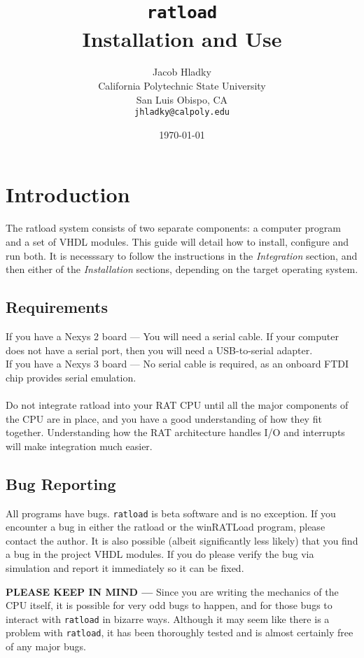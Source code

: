 \documentclass[notitlepage]{article}
\makeatletter
\newcommand*{\toccontents}{\@starttoc{toc}}
\makeatother
\begin{document}
\title{\huge{\texttt{ratload}\\ Installation and Use}}
\author{
  Jacob Hladky\\
  California Polytechnic State University\\
  San Luis Obispo, CA\\
  \texttt{jhladky@calpoly.edu}
}
\date{\today}
\maketitle

\toccontents


\section{Introduction}
The ratload system consists of two separate components: a computer program and a set of VHDL modules. This guide will detail how to install, configure and run both. It is necesssary to follow the instructions in the \emph{Integration} section, and then either of the \emph{Installation} sections, depending on the target operating system.
\subsection{Requirements}
If you have a Nexys 2 board --- You will need a serial cable. If your computer does not have a serial port, then you will need a USB-to-serial adapter.\\
If you have a Nexys 3 board --- No serial cable is required, as an onboard FTDI chip provides serial emulation.\\\\
Do not integrate ratload into your RAT CPU until all the major components of the CPU are in place, and you have a good understanding of how they fit together. Understanding how the RAT architecture handles I/O and interrupts will make integration much easier.
\subsection{Bug Reporting}
All programs have bugs. \texttt{ratload} is beta software and is no exception. If you encounter a bug in either the ratload or the winRATLoad program, please contact the author. It is also possible (albeit significantly less likely) that you find a bug in the project VHDL modules. If you do please verify the bug via simulation and report it immediately so it can be fixed.
\begin{infobox}
\textbf{PLEASE KEEP IN MIND --- } Since you are writing the mechanics of the CPU itself, it is possible for very odd bugs to happen, and for those bugs to interact with \texttt{ratload} in bizarre ways. Although it may seem like there is a problem with \texttt{ratload}, it has been thoroughly tested and is almost certainly free of any major bugs.
\end{infobox}
\end{document}
